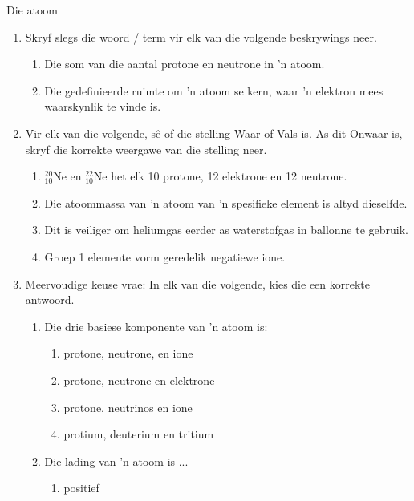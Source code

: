 \begin{eocexercises}{Die atoom}
            \nopagebreak
      \begin{enumerate}[noitemsep, label=\textbf{\arabic*}. ] 
            \item Skryf slegs die woord / term vir elk van die volgende beskrywings neer.
\begin{enumerate}[noitemsep, label=\textbf{\alph*}. ] 
            \item Die som van die aantal protone en neutrone in 'n atoom.
\item Die gedefinieerde ruimte om 'n atoom se kern, waar 'n elektron mees waarskynlik te vinde is.
\end{enumerate}
                \item Vir elk van die volgende, sê of die stelling Waar of Vals is. As dit Onwaar is, skryf die korrekte weergawe van die stelling neer.
\begin{enumerate}[noitemsep, label=\textbf{\alph*}. ] 
            \item $_{10}^{20}\text{Ne}$ en $_{10}^{22}\text{Ne}$ het elk 10 protone, 12 elektrone en 12 neutrone.
\item Die atoommassa van 'n atoom van 'n spesifieke element is altyd dieselfde.
\item Dit is veiliger om heliumgas eerder as waterstofgas in ballonne te gebruik.
\item Groep 1 elemente vorm geredelik negatiewe ione.
\end{enumerate}
                \item Meervoudige keuse vrae: In elk van die volgende, kies die een korrekte antwoord.
\begin{enumerate}[noitemsep, label=\textbf{\alph*}. ] 
            \item Die drie basiese komponente van 'n atoom is:
\begin{enumerate}[noitemsep, label=\textbf{\alph*}. ] 
            \item protone, neutrone, en ione
\item protone, neutrone en elektrone
\item protone, neutrinos en ione
\item protium, deuterium en tritium
\end{enumerate}
                \item Die lading van 'n atoom is ...
\begin{enumerate}[noitemsep, label=\textbf{\alph*}. ] 
            \item positief

\end{enumerate}
\end{enumerate}
\end{enumerate}
\end{eocexercises}
